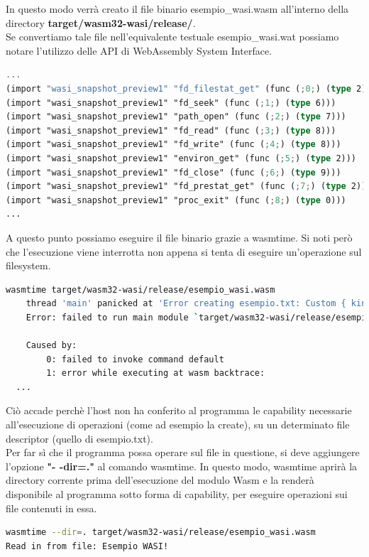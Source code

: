 In questo modo verrà creato il file binario esempio\_wasi.wasm all'interno della directory \textbf{target/wasm32-wasi/release/}.
\\Se convertiamo tale file nell'equivalente testuale esempio\_wasi.wat possiamo notare l'utilizzo delle API di WebAssembly System Interface.
\begin{lstlisting}[language=rust, label=lst:RustWasi, caption={Le API importate di WASI}, showstringspaces=false, numbers=none]
...
(import "wasi_snapshot_preview1" "fd_filestat_get" (func (;0;) (type 2)))
(import "wasi_snapshot_preview1" "fd_seek" (func (;1;) (type 6)))
(import "wasi_snapshot_preview1" "path_open" (func (;2;) (type 7)))
(import "wasi_snapshot_preview1" "fd_read" (func (;3;) (type 8)))
(import "wasi_snapshot_preview1" "fd_write" (func (;4;) (type 8)))
(import "wasi_snapshot_preview1" "environ_get" (func (;5;) (type 2)))
(import "wasi_snapshot_preview1" "fd_close" (func (;6;) (type 9)))
(import "wasi_snapshot_preview1" "fd_prestat_get" (func (;7;) (type 2)))
(import "wasi_snapshot_preview1" "proc_exit" (func (;8;) (type 0)))
...
\end{lstlisting}
A questo punto possiamo eseguire il file binario grazie a wasmtime. Si noti però che l'esecuzione viene interrotta non appena si tenta di eseguire un'operazione sul filesystem.
\begin{lstlisting}[language=Bash, showstringspaces=false,numbers=none]
wasmtime target/wasm32-wasi/release/esempio_wasi.wasm
    thread 'main' panicked at 'Error creating esempio.txt: Custom { kind: Uncategorized, error: "failed to find a pre-opened file descriptor through which \"esempio.txt\" could be opened" }', src\main.rs:8:6
    Error: failed to run main module `target/wasm32-wasi/release/esempio_wasi.wasm`
    
    Caused by:
        0: failed to invoke command default
        1: error while executing at wasm backtrace:
  ...
\end{lstlisting}
Ciò accade perchè l'host non ha conferito al programma le capability necessarie all'esecuzione di operazioni (come ad esempio la create), su un determinato file descriptor (quello di esempio.txt).
\\Per far sì che il programma possa operare sul file in questione, si deve aggiungere l'opzione \textbf{"- -dir=."} al comando wasmtime. In questo modo, wasmtime aprirà la directory corrente prima dell'esecuzione del modulo Wasm e la renderà disponibile al programma sotto forma di capability, per eseguire operazioni sui file contenuti in essa.
\begin{lstlisting}[language=Bash, showstringspaces=false, numbers=none]
wasmtime --dir=. target/wasm32-wasi/release/esempio_wasi.wasm
Read in from file: Esempio WASI!
\end{lstlisting}

